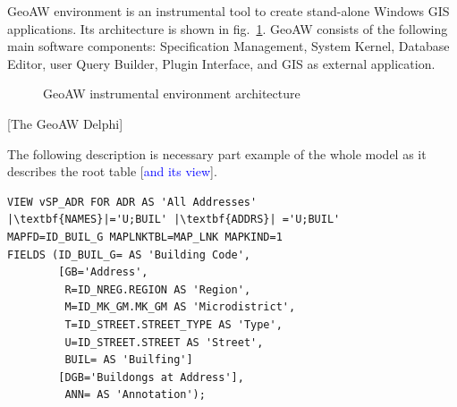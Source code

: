 \documentclass[conference]{IEEEtran}
\newcommand{\e}[2][fcolor]{\textcolor{pcolor}{[}\textcolor{#1}{#2}\textcolor{pcolor}{]}}
\begin{document}
GeoAW environment is an instrumental tool to create stand-alone Windows GIS applications.  Its architecture is shown in fig.~\ref{fig:architecture}.  GeoAW consists of the following main software components: Specification Management,  System Kernel, Database Editor, user Query Builder, Plugin Interface, and GIS as external application.
\begin{figure}[bt]
  \centering
  \def\svgwidth{\linewidth}
  \tiny\sffamily
  \def\db{Database}
  \def\spec{Specification}
  \def\sce{\vtop{Specification\break Management}}
  \def\kerne{Kernel}
  \def\bde{\vtop{Database\break Editor}}
  \def\qb{\vtop{Query\break Builder}}
  \def\map{GIS}
  \def\gb{Graphic Base}
  \def\plug{Plugins}
  \def\intfs{\vtop{Plugin\break Interface}}
  
  \caption{GeoAW instrumental environment architecture}
  \label{fig:architecture}
\end{figure}

\e{The GeoAW Delphi}

The following description is necessary part example of the whole model as it describes the root table \e[blue]{and its view}.

\begin{lstlisting}
VIEW vSP_ADR FOR ADR AS 'All Addresses'
|\textbf{NAMES}|='U;BUIL' |\textbf{ADDRS}| ='U;BUIL'
MAPFD=ID_BUIL_G MAPLNKTBL=MAP_LNK MAPKIND=1
FIELDS (ID_BUIL_G= AS 'Building Code',
        [GB='Address',
         R=ID_NREG.REGION AS 'Region',
         M=ID_MK_GM.MK_GM AS 'Microdistrict',
         T=ID_STREET.STREET_TYPE AS 'Type',
         U=ID_STREET.STREET AS 'Street',
         BUIL= AS 'Builfing']
        [DGB='Buildongs at Address'],
         ANN= AS 'Annotation');
\end{lstlisting}








%
%
\end{document}
